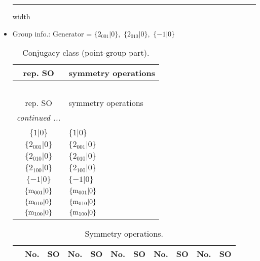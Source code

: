 \documentclass[fleqn,10pt,landscape]{article}
\begin{document}
\begin{itemize}
 \hfil \hrule height 1mm width \textwidth \hfil

\item Group info.: Generator = $\{2{}_{001}|0\},\,\,\{2{}_{010}|0\},\,\,\{-1|0\}$

\begin{center}
\renewcommand{\arraystretch}{1.3}
\begin{longtable}{c|l}
\caption{Conjugacy class (point-group part).}
 \\
 \hline \hline
rep. SO & symmetry operations \\ \hline \endfirsthead

\multicolumn{1}{l}{\tablename\ \thetable{}} \\
 \hline \hline
rep. SO & symmetry operations \\ \hline \endhead

 \hline \hline
\multicolumn{1}{r}{\footnotesize\it continued ...} \\ \endfoot

 \hline \hline
\multicolumn{1}{r}{} \\ \endlastfoot

$\{1|0\}$ & $\{1|0\}$ \\ \hline
$\{2{}_{001}|0\}$ & $\{2{}_{001}|0\}$ \\ \hline
$\{2{}_{010}|0\}$ & $\{2{}_{010}|0\}$ \\ \hline
$\{2{}_{100}|0\}$ & $\{2{}_{100}|0\}$ \\ \hline
$\{-1|0\}$ & $\{-1|0\}$ \\ \hline
$\{{\rm m}_{001}|0\}$ & $\{{\rm m}_{001}|0\}$ \\ \hline
$\{{\rm m}_{010}|0\}$ & $\{{\rm m}_{010}|0\}$ \\ \hline
$\{{\rm m}_{100}|0\}$ & $\{{\rm m}_{100}|0\}$ \\
\end{longtable}
\end{center}
\begin{center}
\renewcommand{\arraystretch}{1.3}
\begin{longtable}{c|cc|cc|cc|cc|cc}
\caption{Symmetry operations.}
 \\
 \hline \hline
 & No. & SO & No. & SO & No. & SO & No. & SO & No. & SO \\ \hline \endfirsthead


\end{longtable}
\end{center}
\end{itemize}
\end{document}
